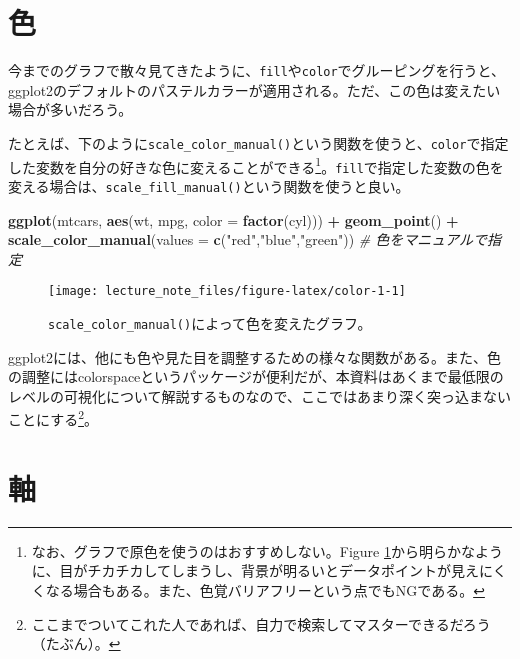 \documentclass[]{book}
\newenvironment{Shaded}{\begin{snugshade}}{\end{snugshade}}
\newcommand{\KeywordTok}[1]{\textcolor[rgb]{0.13,0.29,0.53}{\textbf{#1}}}
\newcommand{\DataTypeTok}[1]{\textcolor[rgb]{0.13,0.29,0.53}{#1}}
\newcommand{\StringTok}[1]{\textcolor[rgb]{0.31,0.60,0.02}{#1}}
\newcommand{\CommentTok}[1]{\textcolor[rgb]{0.56,0.35,0.01}{\textit{#1}}}
\newcommand{\OperatorTok}[1]{\textcolor[rgb]{0.81,0.36,0.00}{\textbf{#1}}}
\newcommand{\NormalTok}[1]{#1}
\let\rmarkdownfootnote\footnote%
\def\footnote{\protect\rmarkdownfootnote}
\begin{document}
\section{色}

今までのグラフで散々見てきたように、\texttt{fill}や\texttt{color}でグルーピングを行うと、ggplot2のデフォルトのパステルカラーが適用される。ただ、この色は変えたい場合が多いだろう。

たとえば、下のように\texttt{scale\_color\_manual()}という関数を使うと、\texttt{color}で指定した変数を自分の好きな色に変えることができる\footnote{なお、グラフで原色を使うのはおすすめしない。Figure
  \ref{fig:color-1}から明らかなように、目がチカチカしてしまうし、背景が明るいとデータポイントが見えにくくなる場合もある。また、色覚バリアフリーという点でもNGである。}。\texttt{fill}で指定した変数の色を変える場合は、\texttt{scale\_fill\_manual()}という関数を使うと良い。



\begin{Shaded}
\begin{Highlighting}[]
\KeywordTok{ggplot}\NormalTok{(mtcars, }\KeywordTok{aes}\NormalTok{(wt, mpg, }\DataTypeTok{color =} \KeywordTok{factor}\NormalTok{(cyl))) }\OperatorTok{+}
\StringTok{  }\KeywordTok{geom_point}\NormalTok{() }\OperatorTok{+}
\StringTok{  }\KeywordTok{scale_color_manual}\NormalTok{(}\DataTypeTok{values =} \KeywordTok{c}\NormalTok{(}\StringTok{"red"}\NormalTok{,}\StringTok{"blue"}\NormalTok{,}\StringTok{"green"}\NormalTok{)) }\CommentTok{# 色をマニュアルで指定}
\end{Highlighting}
\end{Shaded}

\begin{figure}

{\centering \texttt{[image: lecture\_note\_files/figure-latex/color-1-1]} 

}

\caption{\texttt{scale\_color\_manual()}によって色を変えたグラフ。}\label{fig:color-1}
\end{figure}

ggplot2には、他にも色や見た目を調整するための様々な関数がある。また、色の調整にはcolorspaceというパッケージが便利だが、本資料はあくまで最低限のレベルの可視化について解説するものなので、ここではあまり深く突っ込まないことにする\footnote{ここまでついてこれた人であれば、自力で検索してマスターできるだろう（たぶん）。}。

\section{軸}
\end{document}

